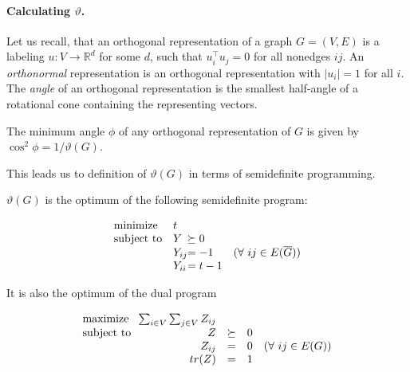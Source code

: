 \paragraph{Calculating \boldmath$\vartheta$.}

Let us recall, that an orthogonal representation of a graph $G = (V, E)$ is a labeling $u: V \rightarrow \mathbb{R}^d$ for some $d$, such that $u_i^\intercal u_j = 0$ for all nonedges $ij$. An \emph{orthonormal} representation is an orthogonal representation with $|u_i| = 1$ for all $i$. The \emph{angle} of an orthogonal representation is the smallest half-angle of a rotational cone containing the representing vectors.

\begin{theorem}
  The minimum angle $\phi$ of any orthogonal representation of $G$ is given by $\cos^2\phi = 1/\vartheta(G)$.
\end{theorem}

This leads us to definition of $\vartheta(G)$ in terms of semidefinite programming.

\begin{theorem}
  $\vartheta(G)$ is the optimum of the following semidefinite program:

  \begin{equation*}
    \begin{array}{ll@{}ll}
      \text{minimize}   & t      &                                              \\
      \text{subject to} & Y      & \succeq 0                                    \\
                        & Y_{ij} & = -1      & (\forall~ij \in E(\overline{G})) \\
                        & Y_{ii} & = t - 1                                      \\
    \end{array}
  \end{equation*}

  It is also the optimum of the dual program

  \begin{equation*}
    \begin{array}{l@{}rlll}
      \text{maximize~~}   & \sum_{i \in V} \sum_{j \in V}  Z_{ij} &                                     \\
      \text{subject to~~} & Z                                     & \succeq & 0                         \\
                          & Z_{ij}                                & =       & 0 & (\forall~ij \in E(G)) \\
                          & tr(Z)                                 & =       & 1                         \\
    \end{array}
  \end{equation*}
\end{theorem}

